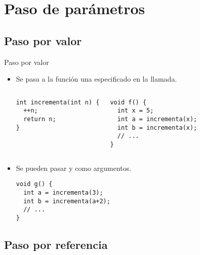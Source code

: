 \section{Paso de parámetros}

\subsection{Paso por valor}

\begin{frame}[fragile]{Paso por valor}
\begin{itemize}
  \item Se pasa a la función una  
        especificado en la llamada.
\begin{columns}[T]
\begin{lstlisting}
int incrementa(int n) {
  ++n;
  return n;
}
\end{lstlisting}

\begin{lstlisting}
void f() {
  int x = 5;
  int a = incrementa(x);
  int b = incrementa(x);
  // ...
}
\end{lstlisting}
\end{columns}

  \item Se pueden pasar  y  
        como argumentos.
\begin{lstlisting}
void g() {
  int a = incrementa(3);
  int b = incrementa(a+2);
  // ...
}
\end{lstlisting}

\end{itemize}
\end{frame}

\subsection{Paso por referencia}

